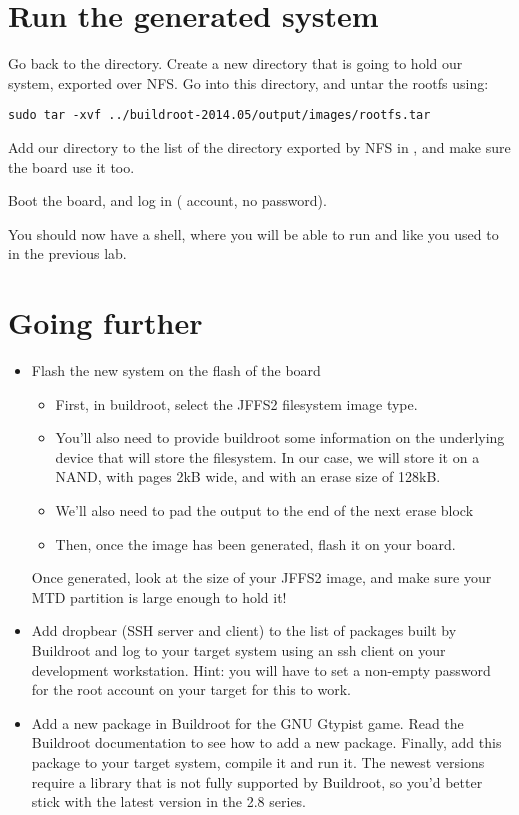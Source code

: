 \section{Run the generated system}

Go back to the  directory. Create
a new directory  that is going to hold our system,
exported over NFS. Go into this directory, and untar the rootfs using:

\begin{verbatim}
sudo tar -xvf ../buildroot-2014.05/output/images/rootfs.tar
\end{verbatim}

Add our  directory to the list of the directory exported
by NFS in , and make sure the board use it too.

Boot the board, and log in ( account, no password).

You should now have a shell, where you will be able to run
 and  like you used to in the previous
lab.

\section{Going further}

\begin{itemize}

\item Flash the new system on the flash of the board
  \begin{itemize}
  \item First, in buildroot, select the JFFS2 filesystem image type.
  \item You'll also need to provide buildroot some information on the
    underlying device that will store the filesystem. In our case, we
    will store it on a NAND, with pages 2kB wide, and with an erase
    size of 128kB.
  \item We'll also need to pad the output to the end of the next erase
    block
  \item Then, once the image has been generated, flash it on your
    board.
  \end{itemize}

  Once generated, look at the size of your JFFS2 image, and make sure
  your MTD partition is large enough to hold it!

\item Add dropbear (SSH server and client) to the list of packages
  built by Buildroot and log to your target system using an ssh client
  on your development workstation. Hint: you will have to set a
  non-empty password for the root account on your target for this to
  work.

\item Add a new package in Buildroot for the GNU Gtypist game. Read
  the Buildroot documentation to see how to add a new
  package. Finally, add this package to your target system, compile it
  and run it. The newest versions require a library that is not fully
  supported by Buildroot, so you'd better stick with the latest
  version in the 2.8 series.

\end{itemize}
